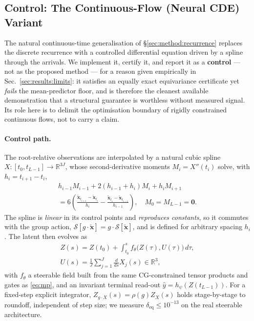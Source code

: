 \subsection{Control: The Continuous-Flow (Neural CDE) Variant}
\label{sec:method:cde-control}

The natural continuous-time generalisation of \S\ref{sec:method:recurrence} replaces the discrete
recurrence with a controlled differential equation driven by a spline through the arrivals. We
implement it, certify it, and report it as a \textbf{control} --- not as the proposed method --- for a
reason given empirically in Sec.~\ref{sec:results:limits}: it satisfies an equally exact equivariance
certificate yet \emph{fails} the mean-predictor floor, and is therefore the cleanest available
demonstration that a structural guarantee is worthless without measured signal. Its role here is to
delimit the optimisation boundary of rigidly constrained continuous flows, not to carry a claim.

\paragraph{Control path.} The root-relative observations are interpolated by a natural cubic spline
$X:[t_0,t_{L-1}]\to\mathbb{R}^{3J}$, whose second-derivative moments $M_i=X''(t_i)$ solve, with
$h_i=t_{i+1}-t_i$,
%
\begin{equation}
\label{eq:spline-moments}
\begin{gathered}
h_{i-1}M_{i-1}+2(h_{i-1}+h_i)M_i+h_iM_{i+1}\\
=6\!\left(\frac{\tilde{\bm{x}}_{t_{i+1}}-\tilde{\bm{x}}_{t_i}}{h_i}
-\frac{\tilde{\bm{x}}_{t_i}-\tilde{\bm{x}}_{t_{i-1}}}{h_{i-1}}\right),
\quad M_0=M_{L-1}=\bm{0}.
\end{gathered}
\end{equation}
%
The spline is \emph{linear} in its control points and \emph{reproduces constants}, so it commutes with
the group action, $\mathcal{S}[g\cdot\tilde{\bm{x}}]=g\cdot\mathcal{S}[\tilde{\bm{x}}]$, and is defined
for arbitrary spacing $h_i$. The latent then evolves as
%
\begin{equation}
\label{eq:cde}
\begin{gathered}
Z(s)=Z(t_0)+\int_{t_0}^{s}f_\theta\big(Z(\tau),U(\tau)\big)\,d\tau,\\[2pt]
U(s)=\frac1J\sum_{j=1}^{J}\frac{d}{ds}X_j(s)\in\mathbb{R}^3,
\end{gathered}
\end{equation}
%
with $f_\theta$ a steerable field built from the same CG-constrained tensor products and gates as
\eqref{eq:mp}, and an invariant terminal read-out $\hat y=h_\psi(Z(t_{L-1}))$. For a fixed-step
explicit integrator, $Z_{g\cdot X}(s)=\rho(g)Z_X(s)$ holds stage-by-stage to roundoff, independent of
step size; we measure $\delta_{\text{eq}}\le10^{-13}$ on the real steerable architecture.

